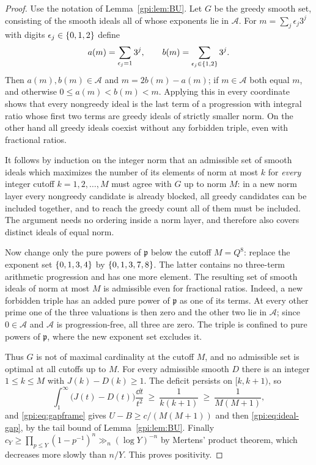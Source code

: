 \begin{proof}
Use the notation of Lemma~\ref{gpi:lem:BU}. Let $G$ be the greedy smooth set, consisting of the
smooth ideals all of whose exponents lie in $\mathcal A$. For $m=\sum_j\epsilon_j3^j$ with
digits $\epsilon_j\in\{0,1,2\}$ define
\[
 a(m)=\sum_{\epsilon_j=1}3^j,\qquad b(m)=\sum_{\epsilon_j\in\{1,2\}}3^j .
\]
Then $a(m),b(m)\in\mathcal A$ and $m=2b(m)-a(m)$; if $m\in\mathcal A$ both equal $m$, and
otherwise $0\le a(m)<b(m)<m$. Applying this in every coordinate shows that every nongreedy
ideal is the last term of a progression with integral ratio whose first two terms are greedy
ideals of strictly smaller norm. On the other hand all greedy ideals coexist without any
forbidden triple, even with fractional ratios.

It follows by induction on the integer norm that an admissible set of smooth ideals which
maximizes the number of its elements of norm at most $k$ for \emph{every} integer cutoff
$k=1,2,\dots,M$ must agree with $G$ up to norm $M$: in a new norm layer every nongreedy
candidate is already blocked, all greedy candidates can be included together, and to reach
the greedy count all of them must be included. The argument needs no ordering inside a norm
layer, and therefore also covers distinct ideals of equal norm.

Now change only the pure powers of $\mathfrak p$ below the cutoff $M=Q^8$: replace the
exponent set $\{0,1,3,4\}$ by $\{0,1,3,7,8\}$. The latter contains no three-term
arithmetic progression and has one more element. The resulting set of smooth ideals of norm
at most $M$ is admissible even for fractional ratios. Indeed, a new forbidden triple has an
added pure power of $\mathfrak p$ as one of its terms. At every other prime one of the three
valuations is then zero and the other two lie in $\mathcal A$; since $0\in\mathcal A$ and
$\mathcal A$ is progression-free, all three are zero. The triple is confined to pure powers
of $\mathfrak p$, where the new exponent set excludes it.

Thus $G$ is not of maximal cardinality at the cutoff $M$, and no admissible set is optimal at
all cutoffs up to $M$. For every admissible smooth $D$ there is an integer $1\le k\le M$ with
$J(k)-D(k)\ge1$. The deficit persists on $[k,k+1)$, so
\[
 \int_1^\infty\bigl(J(t)-D(t)\bigr)\frac{\dd t}{t^2}\ \ge\ \frac1{k(k+1)}\ \ge\ \frac1{M(M+1)},
\]
and \eqref{gpi:eq:gapframe} gives $U-B\ge c/(M(M+1))$ and then \eqref{gpi:eq:ideal-gap}, by
the tail bound of Lemma~\ref{gpi:lem:BU}. Finally
$c_Y\ge\prod_{p\le Y}(1-p^{-1})^n\gg_n(\log Y)^{-n}$ by Mertens' product theorem, which
decreases more slowly than $n/Y$. This proves positivity.


\end{proof}
